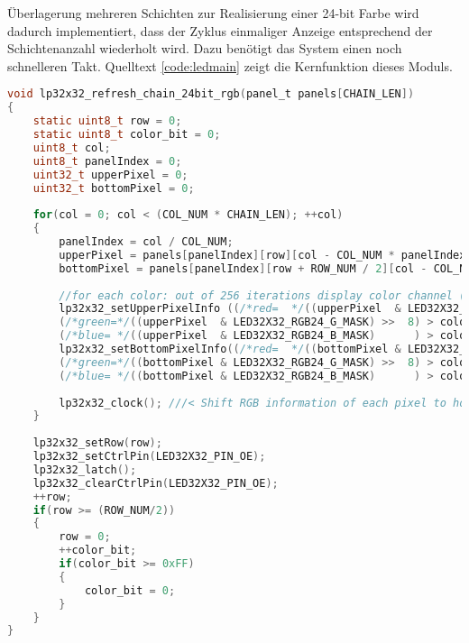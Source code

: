 Überlagerung mehreren Schichten zur Realisierung einer 24-bit Farbe wird dadurch implementiert, dass der Zyklus einmaliger Anzeige entsprechend der Schichtenanzahl wiederholt wird. Dazu benötigt das System einen noch schnelleren Takt. Quelltext \ref{code:ledmain} zeigt die Kernfunktion dieses Moduls.

\begin{lstlisting}[language={c}, caption={Schritte von Panel-Anzeige}, label={code:ledmain}]
void lp32x32_refresh_chain_24bit_rgb(panel_t panels[CHAIN_LEN])
{
	static uint8_t row = 0;
	static uint8_t color_bit = 0;
	uint8_t col;
	uint8_t panelIndex = 0;
	uint32_t upperPixel = 0;
	uint32_t bottomPixel = 0;
	
	for(col = 0; col < (COL_NUM * CHAIN_LEN); ++col)
	{
		panelIndex = col / COL_NUM;
		upperPixel = panels[panelIndex][row][col - COL_NUM * panelIndex].particle_count;
		bottomPixel = panels[panelIndex][row + ROW_NUM / 2][col - COL_NUM * panelIndex].particle_count;
		
		//for each color: out of 256 iterations display color channel (r, g, or b) for <color value> amounts (e.g. with r = 0x40 display red 64 out of 256 times)
		lp32x32_setUpperPixelInfo ((/*red=  */((upperPixel  & LED32X32_RGB24_R_MASK) >> 16) > color_bit), 
		(/*green=*/((upperPixel  & LED32X32_RGB24_G_MASK) >>  8) > color_bit),
		(/*blue= */((upperPixel  & LED32X32_RGB24_B_MASK)      ) > color_bit));
		lp32x32_setBottomPixelInfo((/*red=  */((bottomPixel & LED32X32_RGB24_R_MASK) >> 16) > color_bit), 
		(/*green=*/((bottomPixel & LED32X32_RGB24_G_MASK) >>  8) > color_bit),
		(/*blue= */((bottomPixel & LED32X32_RGB24_B_MASK)      ) > color_bit));
		
		lp32x32_clock(); ///< Shift RGB information of each pixel to horizontal direction
	}
	
	lp32x32_setRow(row);
	lp32x32_setCtrlPin(LED32X32_PIN_OE);
	lp32x32_latch();
	lp32x32_clearCtrlPin(LED32X32_PIN_OE);
	++row;
	if(row >= (ROW_NUM/2))
	{
		row = 0;
		++color_bit;
		if(color_bit >= 0xFF)
		{
			color_bit = 0;
		}
	}
}
\end{lstlisting}
